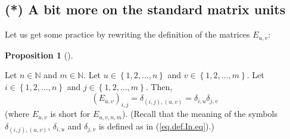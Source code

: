 \documentclass[numbers=enddot,12pt,final,onecolumn,notitlepage]{scrartcl}%
\theoremstyle{definition}
\newtheorem{prop}[theo]{Proposition}
\newenvironment{proposition}[1][]
{\begin{prop}[#1]\begin{leftbar}}
{\end{leftbar}\end{prop}}
\begin{document}
\subsection{\label{sect.gauss.Euv-more}(*) A bit more on the standard matrix
units}

Let us get some practice by rewriting the definition of the matrices $E_{u,v}$:

\begin{proposition}
\label{prop.Euv.deltas}Let $n\in\mathbb{N}$ and $m\in\mathbb{N}$. Let
$u\in\left\{  1,2,\ldots,n\right\}  $ and $v\in\left\{  1,2,\ldots,m\right\}
$. Let $i\in\left\{  1,2,\ldots,n\right\}  $ and $j\in\left\{  1,2,\ldots
,m\right\}  $. Then,%
\begin{equation}
\left(  E_{u,v}\right)  _{i,j}=\delta_{\left(  i,j\right)  ,\left(
u,v\right)  }=\delta_{i,u}\delta_{j,v} \label{eq.prop.Euv.deltas.1}%
\end{equation}
(where $E_{u,v}$ is short for $E_{u,v,n,m}$). (Recall that the meaning of the
symbols $\delta_{\left(  i,j\right)  ,\left(  u,v\right)  }$, $\delta_{i,u}$
and $\delta_{j,v}$ is defined as in (\ref{eq.def.In.eq}).)
\end{proposition}
\end{document}
